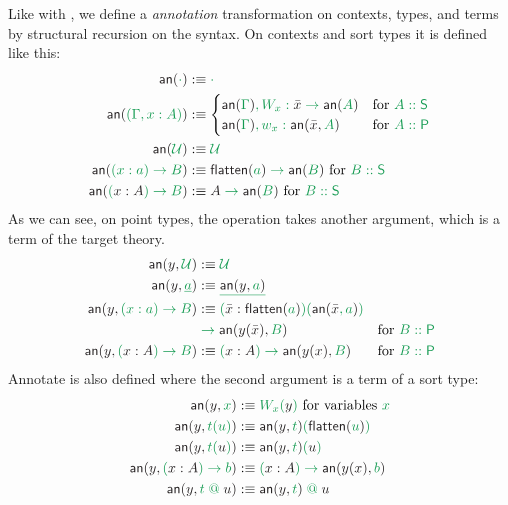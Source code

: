 \begin{defn}[Wellformedness]
Like with \grm{\flatten{}}, we define a \emph{annotation}
transformation \annotate{} on contexts, types, and
terms by structural recursion on the syntax.
On contexts and sort types it is defined like this:
\begin{align*}
\annotate{\cdot}			&:\equiv \grm{\cdot} \\
\annotate{(\Gamma, x : A)}		&:\equiv
	\begin{cases}
	\grm{\annotate{\Gamma}, W_x : \blm{\bar{x}} \to \annotate{A}}	& \text{for \grm{A :: \Sc}} \\
	\grm{\annotate{\Gamma}, w_x : \anntwo{\bar{x}}{A}}		& \text{for \grm{A :: \Pc}}
	\end{cases} \\
\annotate{\UU}				&:\equiv \grm{\UU} \\
\annotate{(x : a) \to B}		&:\equiv \grm{\flatten{a} \to \annotate{B}} \text{ for \grm{B :: \Sc}} \\
\annotate{(\blm{x : A}) \to B}		&:\equiv \grm{\blm{A} \to \annotate{B}}  \text{ for \grm{B :: \Sc}}
\end{align*} %
As we can see, on point types, the operation takes another argument, which is a
term of the target theory.
\begin{align*}
\anntwo{y}{\UU}				&:\equiv \grm{\UU} \\
\anntwo{y}{\underline{a}}		&:\equiv \grm{\underline{\anntwo{y}{a}}} \\
\anntwo{y}{(x : a) \to B}		&:\equiv
	\grm{(\blm{\bar{x} : \flatten{a}})(\annotate{\blm{\bar{x}}, a})}  \\
	& \grm{\hfill{} \to \anntwo{y(\bar{x})}{B}} & \text{for \grm{B :: \Pc}} \\
\anntwo{y}{(\blm{x : A}) \to B}	&:\equiv
	\grm{(\blm{x : A}) \to \anntwo{y(x)}{B}} & \text{for \grm{B :: \Pc}}
\end{align*}
Annotate is also defined where the second argument is a term of a sort type:
\begin{align*}
\anntwo{y}{x}				&:\equiv \grm{W_x(\blm{y})} \text{ for variables \grm{x}} \\
\anntwo{y}{t(u)}			&:\equiv \grm{\anntwo{y}{t}(\flatten{u})} \\
\anntwo{y}{t(\blm{u})}			&:\equiv \grm{\anntwo{y}{t}(\blm{u})} \\
\anntwo{y}{(\blm{x : A}) \to b}		&:\equiv \grm{(\blm{x : A}) \to \anntwo{y(x)}{b}} \\
\anntwo{y}{t \app \blm{u}}		&:\equiv \grm{\anntwo{y}{t} \app \blm{u}}
\end{align*}
\end{defn}

